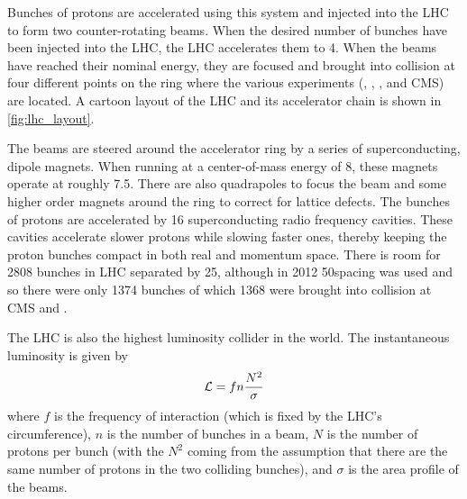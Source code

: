 Bunches of protons are accelerated using this system and injected into the LHC
to form two counter-rotating beams. When the desired number of bunches have
been injected into the LHC, the LHC accelerates them to 4\TeV. When the beams
have reached their nominal energy, they are focused and brought into collision
at four different points on the ring where the various experiments (\ALICE,
\ATLAS, \LHCB, and CMS) are located. A cartoon layout of the LHC and its
accelerator chain is shown in \cref{fig:lhc_layout}.

The beams are steered around the accelerator ring by a series of
superconducting, dipole magnets. When running at a center-of-mass energy of
8\TeV, these magnets operate at roughly 7.5\Tesla. There are also quadrapoles
to focus the beam and some higher order magnets around the ring to correct for
lattice defects. The bunches of protons are accelerated by 16 superconducting
radio frequency cavities. These cavities accelerate slower protons while
slowing faster ones, thereby keeping the proton bunches compact in both real
and momentum space. There is room for 2808 bunches in LHC separated by 25\ns,
although in 2012 50\ns spacing was used and so there were only 1374 bunches of
which 1368 were brought into collision at CMS and \ATLAS.

The LHC is also the highest luminosity collider in the world. The instantaneous
luminosity is given by
\begin{equation}
    \mathcal{L} = f n \frac{N^{2}}{\sigma}
\end{equation}
where $f$ is the frequency of interaction (which is fixed by the LHC's
circumference), $n$ is the number of bunches in a beam, $N$ is the number of
protons per bunch (with the $N^{2}$ coming from the assumption that there are
the same number of protons in the two colliding bunches), and $\sigma$ is the
area profile of the beams.

